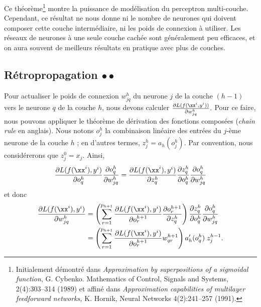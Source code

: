   
Ce théorème\footnote{Initialement démontré dans \textit{Approximation by
    superpositions of a sigmoidal function}, G. Cybenko. Mathematics of
  Control, Signals and Systems, 2(4):303--314 (1989) et affiné dans
  \textit{Approximation capabilities of multilayer feedforward networks,}
  K. Hornik, Neural Networks 4(2):241--257 (1991).}  montre la puissance de
modélisation du perceptron multi-couche. Cependant, ce résultat ne nous donne
ni le nombre de neurones qui doivent composer cette couche intermédiaire, ni
les poids de connexion à utiliser. Les réseaux de neurones à une seule couche
cachée sont généralement peu efficaces, et on aura souvent de meilleurs
résultats en pratique avec plus de couches.


\subsection{Rétropropagation $\bullet \bullet$}
\label{sec:backprop}
Pour actualiser le poids de connexion $w^h_{jq}$ du neurone $j$ de la couche
$(h-1)$ vers le neurone $q$ de la couche $h$, nous devons calculer
$\frac{\partial L(f(\xx^i, y^i))}{\partial w^h_{jq}}.$ Pour ce faire, nous
pouvons appliquer le théorème de dérivation des fonctions composées ({\it chain
  rule} en anglais). Nous notons $o^h_j$ la combinaison linéaire des entrées du
$j$-ème neurone de la couche $h$ ; en d'autres termes, $z^h_j =
a_h(o^h_j)$. Par convention, nous considérerons que $z^0_j = x_j$. Ainsi,
\begin{equation}
  \label{eq:mlp_gradient}
  \frac{\partial L(f(\xx^i), y^i)}{\partial o^h_q} 
  \frac{\partial o^h_q}{\partial w^h_{jq}} 
  = \frac{\partial L(f(\xx^i), y^i)}{\partial z^h_q} 
  \frac{\partial z^h_q}{\partial o^h_q} 
  \frac{\partial o^h_q}{\partial w^h_{jq}}   
\end{equation}
et donc   
\begin{equation}
  \begin{split}
    \frac{\partial L(f(\xx^i), y^i)}{\partial w^h_{jq}} & =
    \left(\sum_{r=1}^{p_{h+1}}  \frac{\partial L(f(\xx^i), y^i)}{\partial o^{h+1}_r}  
      \frac{\partial o^{h+1}_r}{\partial z^h_q} \right)
    \frac{\partial z^h_q}{\partial o^h_q} 
    \frac{\partial o^h_q}{\partial w^h_{jq}} \\
    & = \left(\sum_{r=1}^{p_{h+1}}  \frac{\partial L(f(\xx^i), y^i)}{\partial o^{h+1}_r}  
      w^{h+1}_{qr} \right) a_h'(o^h_q) \; z^{h-1}_j.    
  \end{split}
\end{equation}

